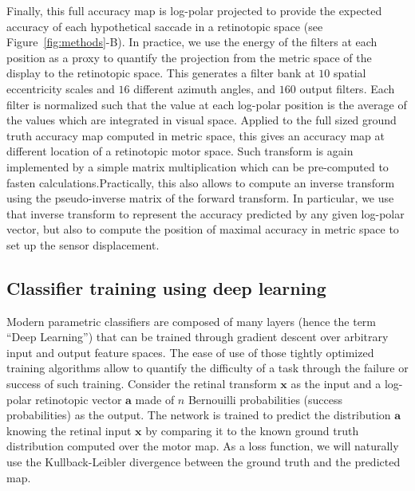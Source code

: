 Finally, this full accuracy map is log-polar projected to provide the expected accuracy of each hypothetical saccade in a retinotopic space (see  Figure~\ref{fig:methods}-B). In practice, we use the energy of the filters at each position as a proxy to quantify the projection from the metric space of the display to the retinotopic space. This generates a filter bank at $10$ spatial eccentricity scales and $16$ different azimuth angles, and $160$ output filters. Each filter is normalized such that the value at each log-polar position is the average of the values which are integrated in visual space. Applied to the full sized ground truth accuracy map computed in metric space, this gives an accuracy map at different location of a retinotopic motor space. \ICANN Such transform is again implemented by a simple matrix multiplication which can be pre-computed to fasten calculations.\fi Practically, this also allows to compute an inverse transform using the pseudo-inverse matrix of the forward transform. In particular, we use that inverse transform to represent the accuracy predicted by any given log-polar vector, but also to compute the position of maximal accuracy in metric space to set up the sensor displacement.


\subsection{Classifier training using deep learning}
Modern parametric classifiers are composed of many layers (hence the term ``Deep Learning'') that can be trained through gradient descent over arbitrary input and output feature spaces. The ease of use of those tightly optimized training algorithms allow to quantify the difficulty of a task through the failure or success of such training. Consider the retinal transform $\boldsymbol{x}$ as the input and a log-polar retinotopic vector $\boldsymbol{a}$ made of $n$ Bernouilli probabilities (success probabilities) as the output. %
The network is trained to predict the distribution $\boldsymbol{a}$ knowing the retinal input $\boldsymbol{x}$ by comparing it to the known ground truth distribution computed over the motor map. As a loss function, we will naturally use the Kullback-Leibler divergence between the ground truth and the predicted map.

